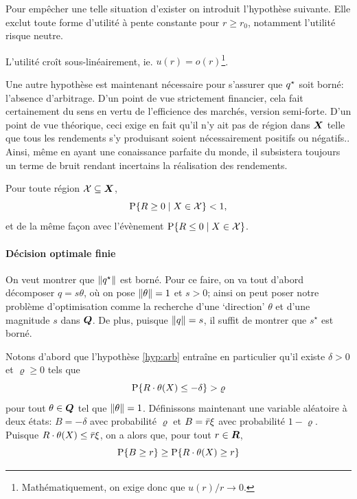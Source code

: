 Pour empêcher une telle situation d'exister on introduit l'hypothèse suivante. Elle exclut
toute forme d'utilité à pente constante pour $r \geq r_0$, notamment l'utilité risque neutre.
\begin{assumption}
  L'utilité croît sous-linéairement, ie. $u(r) = o(r)$\footnote{Mathématiquement, on exige
    donc que $u(r)/r \to 0$.}. 
\end{assumption}

Une autre hypothèse est maintenant nécessaire pour s'assurer que $q^\star$ soit borné:
l'absence d'arbitrage. D'un point de vue strictement financier, cela fait certainement du
sens en vertu de l'efficience des marchés, version semi-forte\cit. D'un point de vue
théorique, ceci exige en fait qu'il n'y ait pas de région dans $\bm{X}$ telle que tous les
rendements s'y produisant soient nécessairement positifs ou négatifs.. Ainsi, même en ayant une conaissance parfaite du monde, il subsistera toujours
un terme de bruit rendant incertains la réalisation des rendements.

\begin{assumption}
  \label{hyp:arb}
  Pour toute région $\mathcal{X}\subseteq\bm{X}$,
  \begin{equation}
    \operatorname{\bm P}\{R \geq 0 \mid X \in \mathcal{X}\} < 1,
  \end{equation}
  et de la même façon avec l'évènement $\operatorname{\bm P}\{R \leq 0 \mid X \in \mathcal{X}\}$. 
\end{assumption}


\paragraph{Décision optimale finie}

  On veut montrer que $\|q^\star\|$ est borné. Pour ce faire, on va tout d'abord décomposer
  $q = s\theta$, où on pose $\|\theta\|=1$ et $s>0$; ainsi on peut poser notre problème
  d'optimisation comme la recherche d'une `direction' $\theta$ et d'une magnitude $s$ dans
  $\bm Q$. De plus, puisque $\|q\| = s$, il suffit de montrer que $s^\star$ est borné.

  Notons d'abord que l'hypothèse \ref{hyp:arb} entraîne en particulier qu'il existe
  $\delta > 0$ et $\varrho \geq 0$ tels que
  \begin{equation}
    \operatorname{\bm P}\{R\cdot \theta(X) \leq -\delta\} > \varrho
  \end{equation}
  pour tout $\theta \in \bm Q$ tel que $\|\theta\| = 1$. Définissons maintenant une variable aléatoire à
  deux états: $B = -\delta$ avec probabilité $\varrho$ et $B = \bar r\xi$ avec probabilité
  $1-\varrho$. Puisque $R\cdot \theta(X) \leq \bar r\xi$, on a alors que, pour tout $r \in \bm{R}$,
  \begin{equation}
    \operatorname{\bm P}\{B\geq r\} \geq \operatorname{\bm P}\{R\cdot \theta(X)\geq r\}
  \end{equation}

